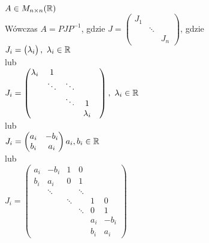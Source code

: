\begin{tw} 
$A \in M_{n \times n}(\mathbb{R})$ \\ 
Wówczas $A = PJP^{-1}$, gdzie $J = \begin{pmatrix} J_1 & & \\ & \ddots & \\ & & J_n 
    \end{pmatrix}$, gdzie \\
    $J_i = \begin{pmatrix} \lambda_i \end{pmatrix},\ \lambda_i \in \mathbb{R}$ \\ 
    lub \\ 
    $J_i = \begin{pmatrix} \lambda_i & 1 & & & \\ 
                           & \ddots & \ddots & & \\ 
                           & & \ddots & 1 &  \\
                           & & & \lambda_i 
    \end{pmatrix},\ \lambda_i \in \mathbb{R}$ \\ 
    lub \\ 
    $J_i = 
    \begin{pmatrix} a_i & -b_i \\ b_i & a_i \end{pmatrix} a_i, b_i \in \mathbb{R}$ \\ 
    lub \\
    $J_i = 
    \begin{pmatrix} 
        a_i & -b_i& 1      & 0      & &  \\ 
        b_i & a_i & 0      & 1      & &  \\ 
            & \ddots    &  & \ddots & &  \\ 
            &     &  \ddots  &  & 1 & 0 \\
            &     &        & \ddots& 0 & 1 \\ 
            &     &        & & a_i &  -b_i \\ 
            &     &        & & b_i & a_i
    \end{pmatrix}$ 
\end{tw} 
